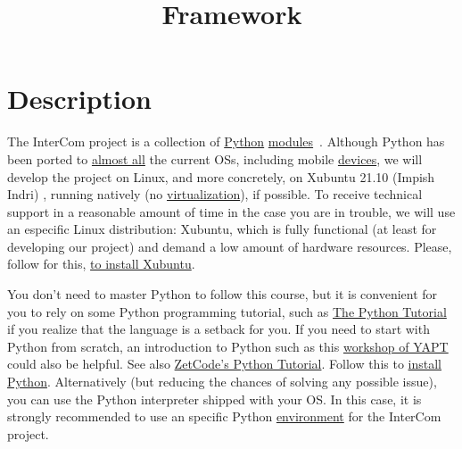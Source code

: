 \title{Framework}

\maketitle

\section{Description}

The InterCom project \cite{intercom} is a collection of
\href{https://www.python.org/}{Python}
\href{https://docs.python.org/3/tutorial/modules.html#modules}{modules}~\cite{python}.
Although Python has been ported to
\href{https://www.python.org/download/other/}{almost all} the current
OSs, including mobile \href{https://kivy.org/#home}{devices}, we will
develop the project on Linux, and more concretely, on Xubuntu 21.10
(Impish Indri) \cite{xubuntu}, running natively (no
\href{https://en.wikipedia.org/wiki/Virtualization}{virtualization}),
if possible. To receive technical support in a reasonable amount of
time in the case you are in trouble, we will use an especific Linux
distribution: Xubuntu, which is fully functional (at least for
developing our project) and demand a low amount of hardware
resources. Please, follow for this,
\href{https://vicente-gonzalez-ruiz.github.io/Xubuntu_install/}{to
  install Xubuntu}.

You don't need to master Python to follow this course, but it is
convenient for you to rely on some Python programming tutorial, such
as \href{https://docs.python.org/3/tutorial/}{The Python Tutorial}
\cite{python-tutorial} if you realize that the language is a setback
for you. If you need to start with Python from scratch, an
introduction to Python such as this
\href{https://github.com/vicente-gonzalez-ruiz/YAPT/tree/master/workshops/programacion_python_ESO}{workshop
  of YAPT} \cite{YAPT} could also be helpful. See also
\href{http://zetcode.com/lang/python/}{ZetCode's Python
  Tutorial}. Follow this to
\href{https://vicente-gonzalez-ruiz.github.io/Python_install/}{install
  Python}. Alternatively (but reducing the chances of solving any
possible issue), you can use the Python interpreter shipped with your
OS. In this case, it is strongly recommended to use an specific Python
\href{https://docs.python.org/3/library/venv.html}{environment} for
the InterCom project.

